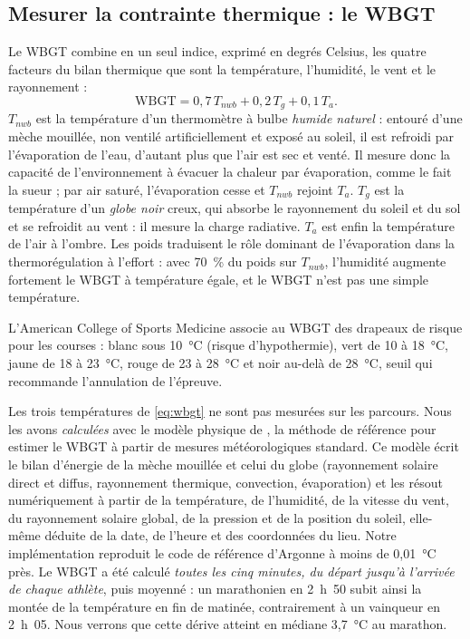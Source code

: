 \documentclass[11pt,a4paper]{article}
\newcommand{\WBGT}{\mathrm{WBGT}}
\begin{document}
\subsection{Mesurer la contrainte thermique : le WBGT}\label{sec:wbgt}

Le WBGT combine en un seul indice, exprimé en degrés Celsius, les quatre facteurs du bilan thermique que sont la
température, l'humidité, le vent et le rayonnement :
\begin{equation}\label{eq:wbgt}
\WBGT = 0{,}7\,T_{nwb} + 0{,}2\,T_{g} + 0{,}1\,T_{a}.
\end{equation}
$T_{nwb}$ est la température d'un thermomètre à bulbe \emph{humide naturel} : entouré d'une mèche mouillée, non
ventilé artificiellement et exposé au soleil, il est refroidi par l'évaporation de l'eau, d'autant plus que l'air
est sec et venté. Il mesure donc la capacité de l'environnement à évacuer la chaleur par évaporation, comme le fait
la sueur ; par air saturé, l'évaporation cesse et $T_{nwb}$ rejoint $T_a$. $T_{g}$ est la température d'un
\emph{globe noir} creux, qui absorbe le rayonnement du soleil et du sol et se refroidit au vent : il mesure la charge
radiative. $T_{a}$ est enfin la température de l'air à l'ombre. Les poids traduisent le rôle dominant de l'évaporation
dans la thermorégulation à l'effort : avec 70~\% du poids sur $T_{nwb}$, l'humidité augmente fortement le WBGT à
température égale, et le WBGT n'est pas une simple température.

L'American College of Sports Medicine \citep{armstrong2007} associe au WBGT des drapeaux de risque pour les courses :
blanc sous 10~°C (risque d'hypothermie), vert de 10 à 18~°C, jaune de 18 à 23~°C, rouge de 23 à 28~°C et noir
au-delà de 28~°C, seuil qui recommande l'annulation de l'épreuve.

Les trois températures de \eqref{eq:wbgt} ne sont pas mesurées sur les parcours. Nous les avons \emph{calculées} avec
le modèle physique de \citet{liljegren2008}, la méthode de référence pour estimer le WBGT à partir de mesures
météorologiques standard. Ce modèle écrit le bilan d'énergie de la mèche mouillée et celui du globe (rayonnement
solaire direct et diffus, rayonnement thermique, convection, évaporation) et les résout numériquement à partir de la
température, de l'humidité, de la vitesse du vent, du rayonnement solaire global, de la pression et de la position du
soleil, elle-même déduite de la date, de l'heure et des coordonnées du lieu. Notre implémentation reproduit le code de
référence d'Argonne à moins de 0,01~°C près. Le WBGT a été calculé \emph{toutes les cinq minutes, du départ jusqu'à
l'arrivée de chaque athlète}, puis moyenné : un marathonien en 2~h~50 subit ainsi la montée de la température en fin
de matinée, contrairement à un vainqueur en 2~h~05. Nous verrons que cette dérive atteint en médiane 3,7~°C au
marathon.
\end{document}
